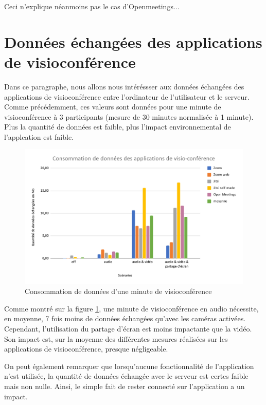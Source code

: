 \documentclass[11pt,a4paper]{report}
\begin{document}
\noindent Ceci n'explique néanmoins pas le cas d'Openmeetings... \eb 

\section{Données échangées des applications de visioconférence}

Dans ce paragraphe, nous allons nous intéréssser aux données échangées des applications de visioconférence entre l'ordinateur de l'utilisateur et le serveur. Comme précédemment, ces valeurs sont données pour une minute de visioconférence à 3 participants (mesure de 30 minutes normalisée à 1 minute). Plus la quantité de données est faible, plus l'impact environnemental de l'applcation est faible.

\begin{figure}[h]
  \centering
  \includegraphics[width=1\linewidth]{graph_donnees.pdf}
  \caption{Consommation de données d'une minute de visioconférence}
  \label{fig:graph_donne}
\end{figure}

Comme montré sur la figure \ref{fig:graph_donne}, une minute de visioconférence en audio nécessite, en moyenne, 7 fois moins de données échangées qu'avec les caméras activées. Cependant, l'utilisation du partage d'écran est moins impactante que la vidéo. Son impact est, sur la moyenne des différentes mesures réalisées sur les applications de visioconférence, presque négligeable.

On peut également remarquer que lorsqu'aucune fonctionnalité de l'application n'est utilisée, la quantité de données échangée avec le serveur est certes faible mais non nulle. Ainsi, le simple fait de rester connecté sur l'application a un impact. 
\end{document}
